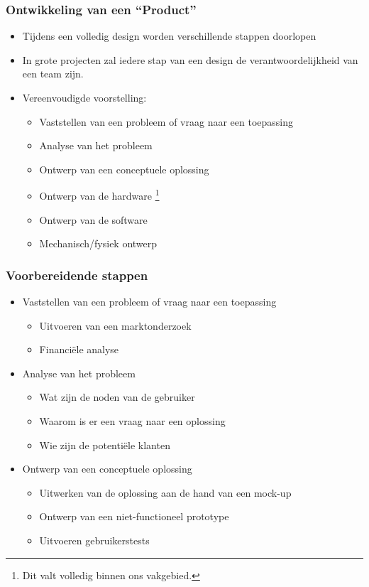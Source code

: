 \documentclass{beamer}
\begin{document}
\begin{frame} 
\frametitle{Ontwikkeling van een ``Product''}
\begin{itemize}[<+->]
 \item Tijdens een volledig design worden verschillende stappen doorlopen
 \item In grote projecten zal iedere stap van een design de verantwoordelijkheid van een team zijn.
 \item Vereenvoudigde voorstelling:
 \begin{itemize}
    \item Vaststellen van een probleem of vraag naar een toepassing
    \item Analyse van het probleem
    \item Ontwerp van een conceptuele oplossing
    \item Ontwerp van de hardware \footnote{Dit valt volledig binnen ons vakgebied.}
    \item Ontwerp van de software \footnotemark[1]
    \item Mechanisch/fysiek ontwerp
 \end{itemize}
\end{itemize}
\end{frame}


\begin{frame} 
\frametitle{Voorbereidende stappen}

\begin{itemize}[<+->]
\item Vaststellen van een probleem of vraag naar een toepassing
  \begin{itemize}
  \item Uitvoeren van een marktonderzoek
  \item Financi\"ele analyse
  \end{itemize}
\item Analyse van het probleem
\begin{itemize}
 \item Wat zijn de noden van de gebruiker
 \item Waarom is er een vraag naar een oplossing
 \item Wie zijn de potenti\"ele klanten
\end{itemize}
\item Ontwerp van een conceptuele oplossing
\begin{itemize}
 \item Uitwerken van de oplossing aan de hand van een mock-up
 \item Ontwerp van een niet-functioneel prototype
 \item Uitvoeren gebruikerstests
\end{itemize}
\end{itemize}
\end{frame}
\end{document}
